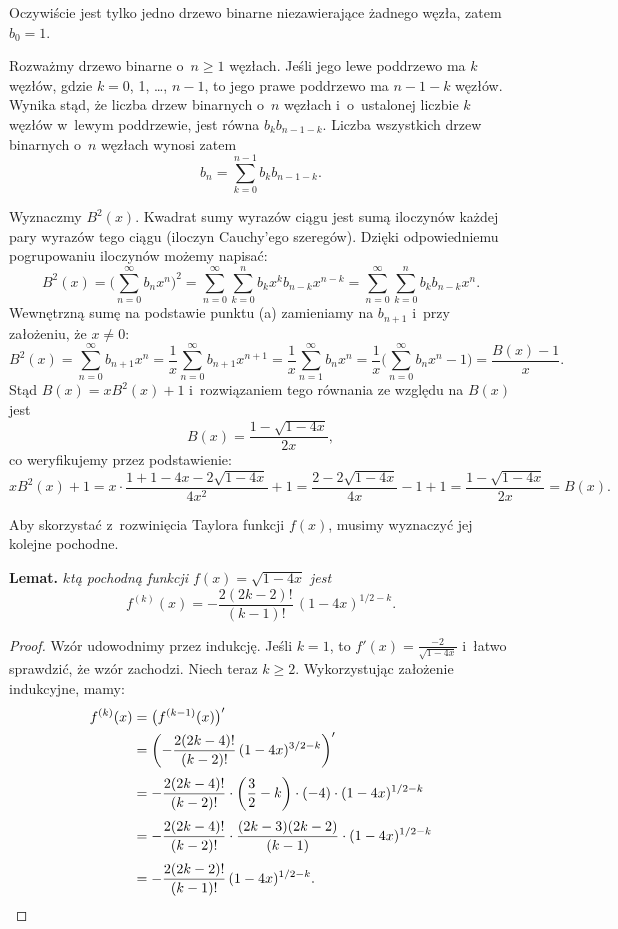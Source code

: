 
\subproblem %
Oczywiście jest tylko jedno drzewo binarne niezawierające żadnego węzła, zatem $b_0=1$.

Rozważmy drzewo binarne o~$n\ge1$ węzłach.
Jeśli jego lewe poddrzewo ma $k$ węzłów, gdzie $k=0$, 1, \dots, $n-1$, to jego prawe poddrzewo ma $n-1-k$ węzłów.
Wynika stąd, że liczba drzew binarnych o~$n$ węzłach i~o~ustalonej liczbie $k$ węzłów w~lewym poddrzewie, jest równa $b_kb_{n-1-k}$.
Liczba wszystkich drzew binarnych o~$n$ węzłach wynosi zatem
\[
	b_n = \sum_{k=0}^{n-1}b_kb_{n-1-k}.
\]

\subproblem %
Wyznaczmy $B^2(x)$.
Kwadrat sumy wyrazów ciągu jest sumą iloczynów każdej pary wyrazów tego ciągu (iloczyn Cauchy'ego szeregów).
Dzięki odpowiedniemu pogrupowaniu iloczynów możemy napisać:
\[
	B^2(x) = \biggl(\sum_{n=0}^\infty b_nx^n\biggr)^2 = \sum_{n=0}^\infty\sum_{k=0}^nb_kx^kb_{n-k}x^{n-k} = \sum_{n=0}^\infty\sum_{k=0}^nb_kb_{n-k}x^n.
\]
Wewnętrzną sumę na podstawie punktu (a) zamieniamy na $b_{n+1}$ i~przy założeniu, że $x\ne0$:
\[
	B^2(x) = \sum_{n=0}^\infty b_{n+1}x^n = \frac{1}{x}\sum_{n=0}^\infty b_{n+1}x^{n+1} = \frac{1}{x}\sum_{n=1}^\infty b_nx^n = \frac{1}{x}\biggl(\sum_{n=0}^\infty b_nx^n-1\biggr) = \frac{B(x)-1}{x}.
\]
Stąd $B(x)=xB^2(x)+1$ i~rozwiązaniem tego równania ze względu na $B(x)$ jest
\[
	B(x) = \frac{1-\sqrt{1-4x}}{2x},
\]
co weryfikujemy przez podstawienie:
\[
	xB^2(x)+1 = x\cdot\frac{1+1-4x-2\sqrt{1-4x}}{4x^2}+1 = \frac{2-2\sqrt{1-4x}}{4x}-1+1 = \frac{1-\sqrt{1-4x}}{2x} = B(x).
\]

\subproblem %

\noindent Aby skorzystać z~rozwinięcia Taylora funkcji $f(x)$, musimy wyznaczyć jej kolejne pochodne.

\medskip
\noindent\textsf{\textbf{Lemat.}} \textit{$k$\nbhyphen tą pochodną funkcji\/ $f(x)=\sqrt{1-4x}$ jest
\[
	f^{(k)}(x) = -\frac{2(2k-2)!}{(k-1)!}\,(1-4x)^{1/2-k}.
\]
}
\begin{proof}
Wzór udowodnimy przez indukcję.
Jeśli $k=1$, to $f'(x)=\frac{-2}{\sqrt{1-4x}}$ i~łatwo sprawdzić, że wzór zachodzi.
Niech teraz $k\ge2$.
Wykorzystując założenie indukcyjne, mamy:
\begin{align*}
	f^{(k)}(x) &= \bigl(f^{(k-1)}(x)\bigr)' \\
	&= \biggl(-\frac{2(2k-4)!}{(k-2)!}\,(1-4x)^{3/2-k}\biggr)' \\[1mm]
	&= -\frac{2(2k-4)!}{(k-2)!}\cdot\biggl(\frac{3}{2}-k\biggr)\cdot(-4)\cdot(1-4x)^{1/2-k} \\[1mm]
	&= -\frac{2(2k-4)!}{(k-2)!}\cdot\frac{(2k-3)(2k-2)}{(k-1)}\cdot(1-4x)^{1/2-k} \\[1mm]
	&= -\frac{2(2k-2)!}{(k-1)!}\,(1-4x)^{1/2-k}. \qedhere
\end{align*}
\end{proof}

